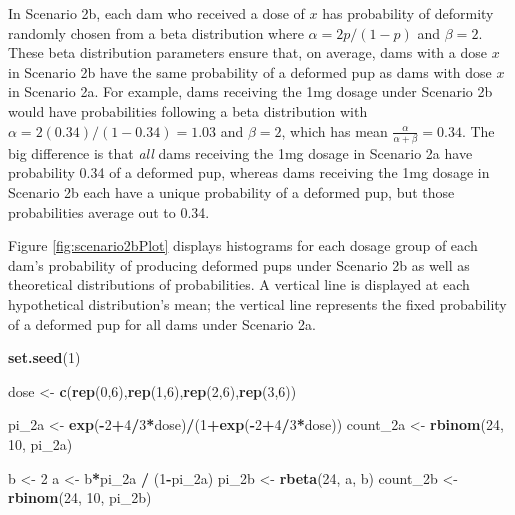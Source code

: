 \documentclass[
]{krantz}
\newenvironment{Shaded}{\begin{snugshade}}{\end{snugshade}}
\newcommand{\DecValTok}[1]{\textcolor[rgb]{0.06,0.06,0.06}{#1}}
\newcommand{\KeywordTok}[1]{\textcolor[rgb]{0.27,0.27,0.27}{\textbf{#1}}}
\newcommand{\NormalTok}[1]{#1}
\newcommand{\OperatorTok}[1]{\textcolor[rgb]{0.43,0.43,0.43}{\textbf{#1}}}
\newcommand{\StringTok}[1]{\textcolor[rgb]{0.5,0.5,0.5}{#1}}
\begin{document}
In Scenario 2b, each dam who received a dose of \(x\) has probability of deformity randomly chosen from a beta distribution where \(\alpha = 2p/(1-p)\) and \(\beta = 2\). These beta distribution parameters ensure that, on average, dams with a dose \(x\) in Scenario 2b have the same probability of a deformed pup as dams with dose \(x\) in Scenario 2a. For example, dams receiving the 1mg dosage under Scenario 2b would have probabilities following a beta distribution with \(\alpha = 2(0.34)/(1-0.34) = 1.03\) and \(\beta = 2\), which has mean \(\frac{\alpha}{\alpha + \beta}=0.34\). The big difference is that \emph{all} dams receiving the 1mg dosage in Scenario 2a have probability 0.34 of a deformed pup, whereas dams receiving the 1mg dosage in Scenario 2b each have a unique probability of a deformed pup, but those probabilities average out to 0.34.

Figure \ref{fig:scenario2bPlot} displays histograms for each dosage group of each dam's probability of producing deformed pups under Scenario 2b as well as theoretical distributions of probabilities. A vertical line is displayed at each hypothetical distribution's mean; the vertical line represents the fixed probability of a deformed pup for all dams under Scenario 2a.

\begin{Shaded}
\begin{Highlighting}[]
\KeywordTok{set.seed}\NormalTok{(}\DecValTok{1}\NormalTok{)}

\NormalTok{dose <-}\StringTok{ }\KeywordTok{c}\NormalTok{(}\KeywordTok{rep}\NormalTok{(}\DecValTok{0}\NormalTok{,}\DecValTok{6}\NormalTok{),}\KeywordTok{rep}\NormalTok{(}\DecValTok{1}\NormalTok{,}\DecValTok{6}\NormalTok{),}\KeywordTok{rep}\NormalTok{(}\DecValTok{2}\NormalTok{,}\DecValTok{6}\NormalTok{),}\KeywordTok{rep}\NormalTok{(}\DecValTok{3}\NormalTok{,}\DecValTok{6}\NormalTok{))}

\NormalTok{pi_2a <-}\StringTok{ }\KeywordTok{exp}\NormalTok{(}\OperatorTok{-}\DecValTok{2}\OperatorTok{+}\DecValTok{4}\OperatorTok{/}\DecValTok{3}\OperatorTok{*}\NormalTok{dose)}\OperatorTok{/}\NormalTok{(}\DecValTok{1}\OperatorTok{+}\KeywordTok{exp}\NormalTok{(}\OperatorTok{-}\DecValTok{2}\OperatorTok{+}\DecValTok{4}\OperatorTok{/}\DecValTok{3}\OperatorTok{*}\NormalTok{dose))}
\NormalTok{count_2a <-}\StringTok{ }\KeywordTok{rbinom}\NormalTok{(}\DecValTok{24}\NormalTok{, }\DecValTok{10}\NormalTok{, pi_2a)}

\NormalTok{b <-}\StringTok{ }\DecValTok{2}
\NormalTok{a <-}\StringTok{ }\NormalTok{b}\OperatorTok{*}\NormalTok{pi_2a }\OperatorTok{/}\StringTok{ }\NormalTok{(}\DecValTok{1}\OperatorTok{-}\NormalTok{pi_2a)}
\NormalTok{pi_2b <-}\StringTok{ }\KeywordTok{rbeta}\NormalTok{(}\DecValTok{24}\NormalTok{, a, b)}
\NormalTok{count_2b <-}\StringTok{ }\KeywordTok{rbinom}\NormalTok{(}\DecValTok{24}\NormalTok{, }\DecValTok{10}\NormalTok{, pi_2b)  }
\end{Highlighting}
\end{Shaded}
\end{document}
